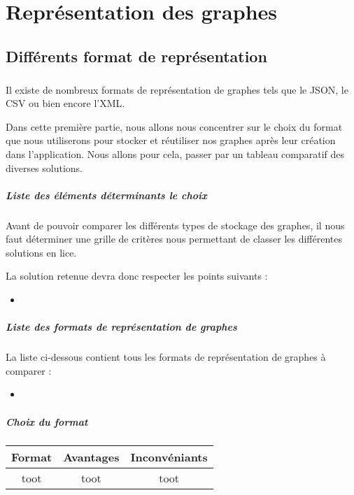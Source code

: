 \chapter{Représentation des graphes}
\section{Différents format de représentation}
  \paragraph{}
  Il existe de nombreux formats de représentation de graphes tels que le JSON, le CSV ou bien encore l'XML.
  
  Dans cette première partie, nous allons nous concentrer sur le choix du format que nous utiliserons pour stocker et réutiliser nos graphes après leur création dans l'application.
  Nous allons pour cela, passer par un tableau comparatif des diverses solutions.
  
  \paragraph{Liste des éléments déterminants le choix}
  Avant de pouvoir comparer les différents types de stockage des graphes, il nous faut déterminer une grille de critères nous permettant de classer les différentes solutions en lice.
  
  La solution retenue devra donc respecter les points suivants : 
  \begin{itemize}
   \item 
  \end{itemize}

  \paragraph{Liste des formats de représentation de graphes}
  La liste ci-dessous contient tous les formats de représentation de graphes à comparer : 
  \begin{itemize}
   \item 
  \end{itemize}

  
  \paragraph{Choix du format}
  
  
  \begin{table}
   \begin{tabular}{|c|c|c|}
    \hline
    Format & Avantages & Inconvéniants \\
    \hline
    \hline
    toot & toot & toot \\
    \hline
   \end{tabular}

  \end{table}
  

  
  